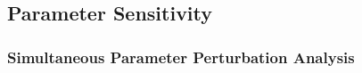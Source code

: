 % 

\subsection{Parameter Sensitivity}\label{sec:GA:param-sens-results}

% 
% 
% 
% 
% 
% 
% 
% 

\subsubsection{Simultaneous Parameter Perturbation Analysis}\label{sec:GA:simult-param-pert}

